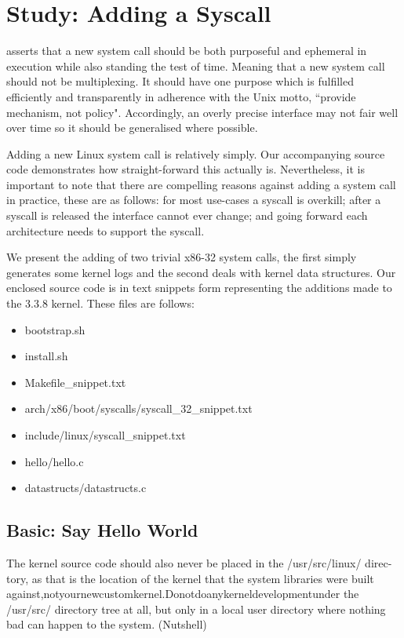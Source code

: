 \documentclass{article}
\begin{document}
\section{Study: Adding a Syscall}

\citet{Love7} asserts that a new system call should be both purposeful and ephemeral in execution while also standing the test of time. 
Meaning that a new system call should not be multiplexing. It should have one purpose which is fulfilled efficiently and transparently 
in adherence with the Unix motto, ``provide mechanism, not policy". Accordingly, 
an overly precise interface may not fair well over time so it should be generalised where possible. 
\par
Adding a new Linux system call is relatively simply. Our accompanying source code demonstrates
how straight-forward this actually is. Nevertheless, it is important to note
that there are compelling reasons against adding 
a system call in practice, these are as follows: for most use-cases a syscall is overkill; 
after a syscall is released the interface cannot ever change;
and going forward each architecture needs to support the syscall.
\par 
We present the adding of two trivial x86-32 system calls, the first simply generates some
kernel logs and the second deals with kernel data structures. Our enclosed 
source code is in text snippets form representing the additions made to
the 3.3.8 kernel. These files are follows:
\begin{itemize}
  \item bootstrap.sh
  \item install.sh
  \item Makefile\_snippet.txt
  \item arch/x86/boot/syscalls/syscall\_32\_snippet.txt
  \item include/linux/syscall\_snippet.txt
  \item hello/hello.c
  \item datastructs/datastructs.c
\end{itemize}
  
\subsection{Basic: Say Hello World}
\lipsum[1]
The kernel source code should also never be placed in the /usr/src/linux/ direc- tory, as that is the location of the kernel that the system libraries were built against,notyournewcustomkernel.Donotdoanykerneldevelopmentunder the /usr/src/ directory tree at all, but only in a local user directory where nothing bad can happen to the system.
(Nutshell)
\end{document}
